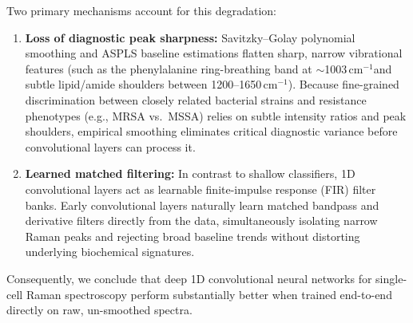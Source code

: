 \documentclass[journal,onecolumn]{IEEEtran}
\newcommand{\wn}{\,cm$^{-1}$}              %
\begin{document}
Two primary mechanisms account for this degradation:
\begin{enumerate}
  \item \textbf{Loss of diagnostic peak sharpness:} Savitzky--Golay polynomial
        smoothing and ASPLS baseline estimations flatten sharp, narrow vibrational
        features (such as the phenylalanine ring-breathing band at
        $\sim$1003\wn and subtle lipid/amide shoulders between 1200--1650\wn).
        Because fine-grained discrimination between closely related bacterial
        strains and resistance phenotypes (e.g., MRSA vs.\ MSSA) relies on subtle
        intensity ratios and peak shoulders, empirical smoothing eliminates
        critical diagnostic variance before convolutional layers can process it.
  \item \textbf{Learned matched filtering:} In contrast to shallow classifiers,
        1D convolutional layers act as learnable finite-impulse response (FIR)
        filter banks. Early convolutional layers naturally learn matched bandpass
        and derivative filters directly from the data, simultaneously isolating
        narrow Raman peaks and rejecting broad baseline trends without distorting
        underlying biochemical signatures.
\end{enumerate}
Consequently, we conclude that deep 1D convolutional neural networks for single-cell
Raman spectroscopy perform substantially better when trained end-to-end directly
on raw, un-smoothed spectra.
\end{document}
